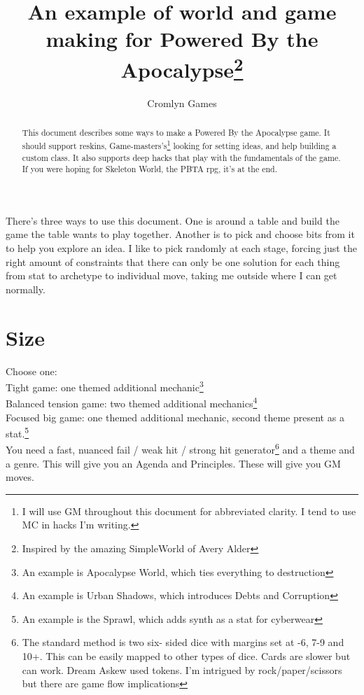 \documentclass{tufte-handout}
\title{An example of world and game making for Powered By the Apocalypse\thanks{Inspired by the amazing SimpleWorld of Avery Alder}}
\author[Cromlyn Games]{Cromlyn Games}
\begin{document}
\maketitle%

\begin{abstract}
\noindent
This document describes some ways to make  a Powered By the Apocalypse game.
It should support reskins, Game-masters's\footnote{I will use GM throughout this document for abbreviated clarity. I tend to use MC in hacks I'm writing.} looking for setting ideas, and help building a custom class.
It also supports deep hacks that play with the fundamentals of the game.
If you were hoping for Skeleton World, the PBTA rpg, it's at the end.
\end{abstract}

There's three ways to use this document. One is around a table and build the game the table wants to play together. Another is to pick and choose bits from it to help you explore an idea. I like to pick randomly at each stage, forcing just the right amount of constraints that there can only be one solution for each thing from stat to archetype to individual move, taking me outside where I can get normally.

\section{Size}
Choose one:\\
Tight game: one themed additional mechanic\footnote{An example is Apocalypse World, which ties everything to destruction} \\
Balanced tension game: two themed additional mechanics\footnote{An example is Urban Shadows, which introduces Debts and Corruption}\\
Focused big game: one themed additional mechanic, second theme present as a stat.\footnote{An example is the Sprawl, which adds synth as a stat for cyberwear}\\


You need a fast, nuanced fail / weak hit / strong hit generator\footnote{The standard method is two six- sided dice with margins set at -6, 7-9 and 10+. This can be easily mapped to other types of dice. Cards are slower but can work. Dream Askew used tokens. I'm intrigued by rock/paper/scissors but there are game flow implications}
 and a theme and a genre. This will give you an Agenda and Principles. These will give you GM moves. 
\end{document}
